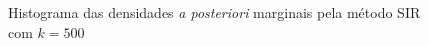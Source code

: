 \documentclass[9pt]{beamer}
\begin{document}
\begin{frame}
\begin{figure}[t]
	\caption{Histograma das densidades \textit{a posteriori} marginais pela método SIR com $k = 500$}%
\end{figure}
\end{frame}
\begin{frame}
\begin{figure}[t]%
	\centering
	\qquad
	\subfloat[Histograma de $\nu$]{{
			\label{fig:nu_sir_5000}
}}
\end{figure}
\end{frame}
\end{document}
